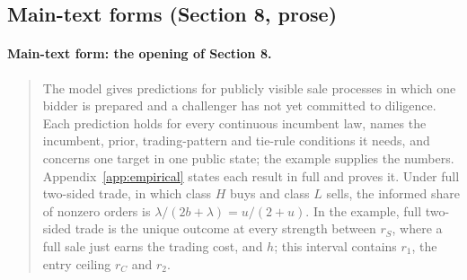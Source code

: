 \subsection*{Main-text forms (Section 8, prose)}


\paragraph{Main-text form: the opening of Section 8.}
\begin{quote}
The model gives predictions for publicly visible sale processes in which one bidder is prepared and a challenger has
not yet committed to diligence. Each prediction holds for every continuous incumbent law, names the incumbent, prior,
trading-pattern and tie-rule conditions it needs, and concerns one target in one public state; the example supplies
the numbers.
Appendix~\ref{app:empirical} states each result in full and proves it. Under full two-sided trade, in which class
\(H\) buys and class \(L\) sells, the informed share of nonzero orders is \(\lambda/(2b+\lambda)=u/(2+u)\). In the
example, full two-sided trade is the unique outcome at every strength between \(r_S\), where a full sale just earns
the trading cost, and \(h\); this interval contains \(r_1\), the entry ceiling \(r_C\) and \(r_2\).
\end{quote}

